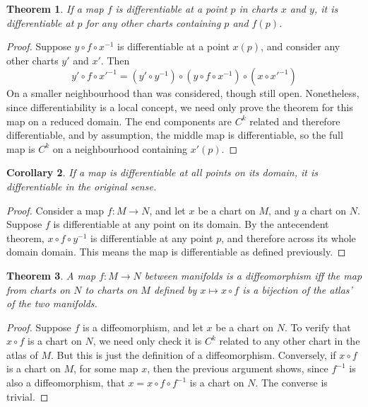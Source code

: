 \documentclass[12pt]{report}
\theoremstyle{plain}
\newtheorem{theorem}{Theorem}[chapter]
\newtheorem{corollary}[theorem]{Corollary}
\theoremstyle{definition}
\begin{document}
\begin{theorem}
    If a map $f$ is differentiable at a point $p$ in charts $x$ and $y$, it is differentiable at $p$ for any other charts containing $p$ and $f(p)$.
\end{theorem}
\begin{proof}
    Suppose $y \circ f \circ x^{-1}$ is differentiable at a point $x(p)$, and consider any other charts $y'$ and $x'$. Then
    \[ y' \circ f \circ x'^{-1} = (y' \circ y^{-1}) \circ (y \circ f \circ x^{-1}) \circ (x \circ x'^{-1}) \]
    On a smaller neighbourhood than was considered, though still open. Nonetheless, since differentiability is a local concept, we need only prove the theorem for this map on a reduced domain. The end components are $C^k$ related and therefore differentiable, and by assumption, the middle map is differentiable, so the full map is $C^k$ on a neighbourhood containing $x'(p)$.
\end{proof}

\begin{corollary}
    If a map is differentiable at all points on its domain, it is differentiable in the original sense.
\end{corollary}
\begin{proof}
    Consider a map $f:M \to N$, and let $x$ be a chart on $M$, and $y$ a chart on $N$. Suppose $f$ is differentiable at any point on its domain. By the antecendent theorem, $x \circ f \circ y^{-1}$ is differentiable at any point $p$, and therefore across its whole domain domain. This means the map is differentiable as defined previously.
\end{proof}

\begin{theorem}
    A map $f:M \to N$ between manifolds is a diffeomorphism iff the map from charts on $N$ to charts on $M$ defined by $x \mapsto x \circ f$ is a bijection of the atlas' of the two manifolds.
\end{theorem}
\begin{proof}
    Suppose $f$ is a diffeomorphism, and let $x$ be a chart on $N$. To verify that $x \circ f$ is a chart on $N$, we need only check it is $C^k$ related to any other chart in the atlas of $M$. But this is just the definition of a diffeomorphism. Conversely, if $x \circ f$ is a chart on $M$, for some map $x$, then the previous argument shows, since $f^{-1}$ is also a diffeomorphism, that $x = x \circ f \circ f^{-1}$ is a chart on $N$. The converse is trivial.
\end{proof}
\end{document}
